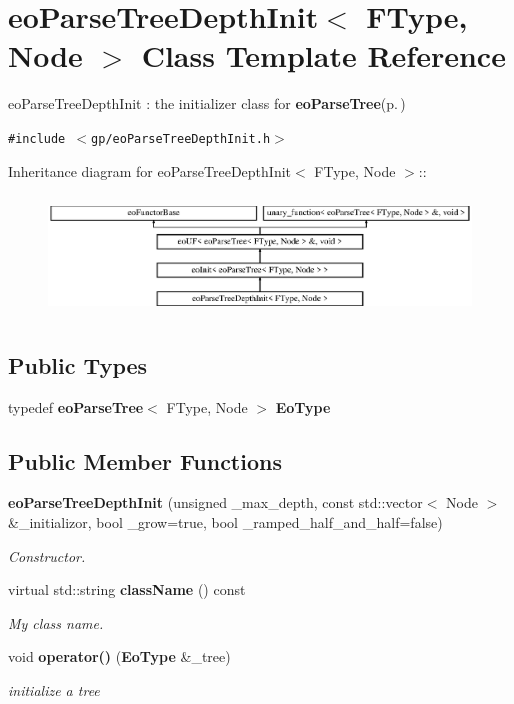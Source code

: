 \section{eo\-Parse\-Tree\-Depth\-Init$<$ FType, Node $>$ Class Template Reference}
\label{classeo_parse_tree_depth_init}
eo\-Parse\-Tree\-Depth\-Init : the initializer class for {\bf eo\-Parse\-Tree}{\rm (p.\,\pageref{classeo_parse_tree})}  


{\tt \#include $<$gp/eo\-Parse\-Tree\-Depth\-Init.h$>$}

Inheritance diagram for eo\-Parse\-Tree\-Depth\-Init$<$ FType, Node $>$::\begin{figure}[H]
\begin{center}
\leavevmode
\includegraphics[height=3.21839cm]{classeo_parse_tree_depth_init}
\end{center}
\end{figure}
\subsection*{Public Types}
\begin{CompactItemize}
\item 
typedef {\bf eo\-Parse\-Tree}$<$ FType, Node $>$ {\bf Eo\-Type}\label{classeo_parse_tree_depth_init_w0}

\end{CompactItemize}
\subsection*{Public Member Functions}
\begin{CompactItemize}
\item 
{\bf eo\-Parse\-Tree\-Depth\-Init} (unsigned \_\-max\_\-depth, const std::vector$<$ Node $>$ \&\_\-initializor, bool \_\-grow=true, bool \_\-ramped\_\-half\_\-and\_\-half=false)
\begin{CompactList}\small\item\em Constructor. \item\end{CompactList}\item 
virtual std::string {\bf class\-Name} () const \label{classeo_parse_tree_depth_init_a1}

\begin{CompactList}\small\item\em My class name. \item\end{CompactList}\item 
void {\bf operator()} ({\bf Eo\-Type} \&\_\-tree)
\begin{CompactList}\small\item\em initialize a tree \item\end{CompactList}\end{CompactItemize}
